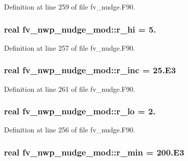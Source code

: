 Definition at line 259 of file fv\-\_\-nudge.\-F90.

\subsubsection[{r\-\_\-hi}]{\setlength{\rightskip}{0pt plus 5cm}real fv\-\_\-nwp\-\_\-nudge\-\_\-mod\-::r\-\_\-hi = 5.\hspace{0.3cm}{\ttfamily [private]}}\label{classfv__nwp__nudge__mod_a333405a63e3356a6a4f7798929dec480}


Definition at line 257 of file fv\-\_\-nudge.\-F90.

\subsubsection[{r\-\_\-inc}]{\setlength{\rightskip}{0pt plus 5cm}real fv\-\_\-nwp\-\_\-nudge\-\_\-mod\-::r\-\_\-inc = 25.E3\hspace{0.3cm}{\ttfamily [private]}}\label{classfv__nwp__nudge__mod_a73e8b9cff0944e7d9517c41fb7fed00f}


Definition at line 261 of file fv\-\_\-nudge.\-F90.

\subsubsection[{r\-\_\-lo}]{\setlength{\rightskip}{0pt plus 5cm}real fv\-\_\-nwp\-\_\-nudge\-\_\-mod\-::r\-\_\-lo = 2.\hspace{0.3cm}{\ttfamily [private]}}\label{classfv__nwp__nudge__mod_ab0d4afa46d379b1dfdfb896cbc99823d}


Definition at line 256 of file fv\-\_\-nudge.\-F90.

\subsubsection[{r\-\_\-min}]{\setlength{\rightskip}{0pt plus 5cm}real fv\-\_\-nwp\-\_\-nudge\-\_\-mod\-::r\-\_\-min = 200.E3\hspace{0.3cm}{\ttfamily [private]}}\label{classfv__nwp__nudge__mod_aa3bb326deaf67f4dff2228ac0abba2c8}


